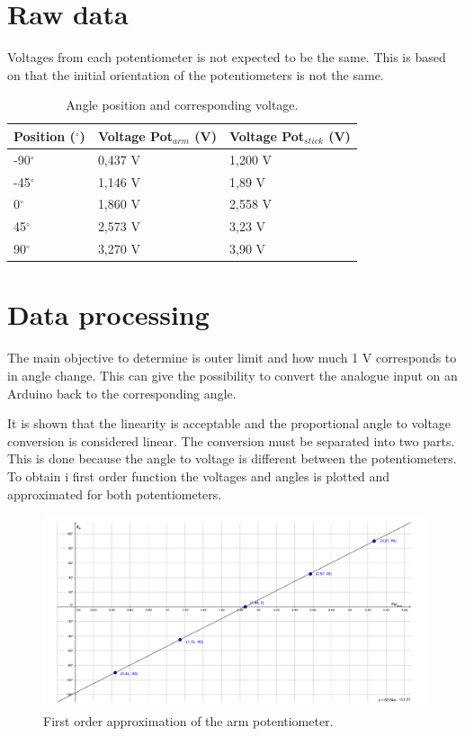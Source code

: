 \section*{Raw data}
Voltages from each potentiometer is not expected to be the same. This is based on that the initial orientation of the potentiometers is not the same. 
\begin{table}[htbp]
\centering
\begin{tabular}{lll}
\hline
Position ($^\circ$) & Voltage Pot$_{arm}$ (V) & Voltage Pot$_{stick}$ (V) \\ \hline
-90$^\circ$         & 0,437 V                 & 1,200 V                   \\
-45$^\circ$         & 1,146 V                 & 1,89 V                   \\
0$^\circ$           & 1,860 V                 & 2,558 V                   \\
45$^\circ$          & 2,573 V                 & 3,23 V                   \\
90$^\circ$          & 3,270 V                 & 3,90 V                   
\end{tabular}
\caption{Angle position and corresponding voltage.}
\label{AngleTable}
\end{table}
\section*{Data processing}
The main objective to determine is outer limit and how much 1 V corresponds to in angle change. This can give the possibility to convert the analogue input on an Arduino back to the corresponding angle. 


It is shown that the linearity is acceptable and the proportional angle to voltage conversion is considered linear.
The conversion must be separated into two parts. This is done because the angle to voltage is different between the potentiometers.
To obtain i first order function the voltages and angles is plotted and approximated for both potentiometers.

\begin{figure}[htbp]
\hspace*{-3cm}  
\centering
\includegraphics[width=0.95\paperwidth]{figures/appendix/PotentiometerPlot.pdf}
\caption{First order approximation of the arm potentiometer.}
\label{fig:PotentiometerPlot}
\end{figure}
\bigbreak

